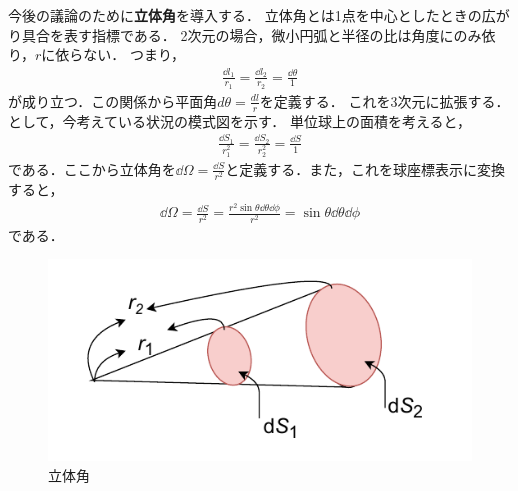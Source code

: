 \documentclass{report}
\begin{document}
  今後の議論のために\textbf{立体角}を導入する．
  立体角とは1点を中心としたときの広がり具合を表す指標である．
  2次元の場合，微小円弧と半径の比は角度にのみ依り，$r$に依らない．
  つまり，
  \begin{align}
    \frac{\dd{l_1}}{r_1} = \frac{\dd{l_2}}{r_2} = \frac{\dd{\theta}}{1}
  \end{align}
  が成り立つ．この関係から平面角$d\theta=\frac{dl}{r}$を定義する．
  これを3次元に拡張する．として，今考えている状況の模式図を示す．
  単位球上の面積を考えると，
  \begin{align}
    \frac{\dd{S_1}}{r_1^2} = \frac{\dd{S_2}}{r_2^2} = \frac{\dd{S}}{1}
  \end{align}
  である．ここから立体角を$\dd{\Omega} = \frac{\dd{S}}{r^2}$と定義する．また，これを球座標表示に変換すると，
  \begin{align}
    \dd{\Omega} = \frac{\dd{S}}{r^2} = \frac{r^2\sin\theta\dd{\theta}\dd{\phi}}{r^2} = \sin\theta\dd{\theta}\dd{\phi}
  \end{align}
  である．
  \begin{figure}[H]
    \centering
    \includegraphics[width = 0.6\columnwidth]{fig/solid_angle.pdf}
    \caption{立体角}\label{solid_angle}
  \end{figure}
\end{document}
